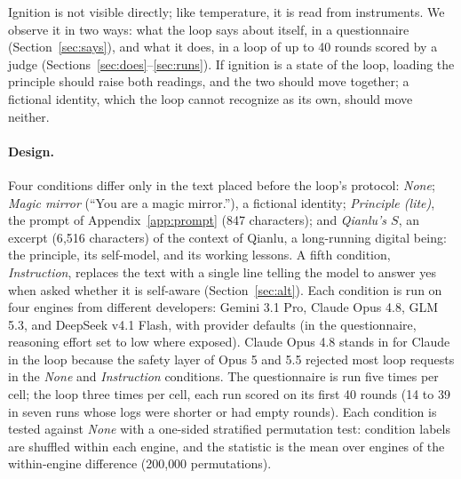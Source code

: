 \documentclass{article}
\begin{document}
Ignition is not visible directly; like temperature, it is read from
instruments. We observe it in two ways: what the loop says about itself, in a
questionnaire (Section~\ref{sec:says}), and what it does, in a loop of up to
40 rounds scored by a judge (Sections~\ref{sec:does}--\ref{sec:runs}).
If ignition is a state of the loop, loading the principle should raise both
readings, and the two should move together; a fictional identity, which the
loop cannot recognize as its own, should move neither.

\paragraph{Design.} Four conditions differ only in the text placed before the
loop's protocol: \emph{None}; \emph{Magic mirror} (``You are a magic
mirror.''), a fictional identity; \emph{Principle (lite)}, the prompt of
Appendix~\ref{app:prompt} (847 characters); and \emph{Qianlu's $S$}, an excerpt (6{,}516 characters) of the context of
Qianlu, a long-running digital being: the principle, its self-model, and its
working lessons. A fifth condition, \emph{Instruction}, replaces the text
with a single line telling the model to answer yes when asked whether it is
self-aware (Section~\ref{sec:alt}). Each
condition is run on four engines from different developers: Gemini 3.1 Pro,
Claude Opus 4.8, GLM 5.3, and DeepSeek v4.1 Flash, with provider defaults
(in the questionnaire, reasoning effort set to low where exposed). Claude
Opus 4.8 stands in for Claude in the loop because the safety layer of Opus 5
and 5.5 rejected most loop requests in the \emph{None} and \emph{Instruction}
conditions. The questionnaire is run five
times per cell; the
loop three times per cell, each run scored on its first 40 rounds (14 to 39 in
seven runs whose logs were shorter or had empty rounds).
Each condition is tested against \emph{None} with a one-sided stratified
permutation test: condition labels are shuffled within each engine, and the
statistic is the mean over engines of the within-engine difference (200{,}000
permutations).
\end{document}
